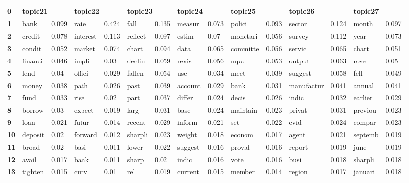 \begin{tabular}{|l|l|l||l|l||l|l||l|l||l|l||l|l||l|l||}
\toprule
\textbf{0} & \multicolumn{2}{l}{topic21} & \multicolumn{2}{l}{topic22} & \multicolumn{2}{l}{topic23} & \multicolumn{2}{l}{topic24} & \multicolumn{2}{l}{topic25} & \multicolumn{2}{l}{topic26} & \multicolumn{2}{l}{topic27} \\
\midrule
\textbf{1 } &  bank &  0.099 &  rate &  0.424 &  fall &  0.135 &  measur &  0.073 &  polici &  0.093 &  sector &  0.124 &  month &  0.097 \\
\textbf{2 } &  credit &  0.078 &  interest &  0.113 &  reflect &  0.097 &  estim &  0.07 &  monetari &  0.056 &  survey &  0.112 &  year &  0.073 \\
\textbf{3 } &  condit &  0.052 &  market &  0.074 &  chart &  0.094 &  data &  0.065 &  committe &  0.056 &  servic &  0.065 &  chart &  0.051 \\
\textbf{4 } &  financi &  0.046 &  impli &  0.03 &  declin &  0.059 &  revis &  0.056 &  mpc &  0.053 &  output &  0.063 &  rose &  0.05 \\
\textbf{5 } &  lend &  0.04 &  offici &  0.029 &  fallen &  0.054 &  use &  0.034 &  meet &  0.039 &  suggest &  0.058 &  fell &  0.049 \\
\textbf{6 } &  money &  0.038 &  path &  0.026 &  past &  0.039 &  account &  0.029 &  bank &  0.031 &  manufactur &  0.041 &  annual &  0.041 \\
\textbf{7 } &  fund &  0.033 &  rise &  0.02 &  part &  0.037 &  differ &  0.024 &  decis &  0.026 &  indic &  0.032 &  earlier &  0.029 \\
\textbf{8 } &  borrow &  0.03 &  expect &  0.019 &  larg &  0.031 &  base &  0.024 &  maintain &  0.023 &  privat &  0.031 &  previou &  0.023 \\
\textbf{9 } &  loan &  0.021 &  futur &  0.014 &  recent &  0.029 &  inform &  0.021 &  set &  0.022 &  evid &  0.024 &  compar &  0.023 \\
\textbf{10} &  deposit &  0.02 &  forward &  0.012 &  sharpli &  0.023 &  weight &  0.018 &  econom &  0.017 &  agent &  0.021 &  septemb &  0.019 \\
\textbf{11} &  broad &  0.02 &  basi &  0.011 &  lower &  0.022 &  suggest &  0.016 &  provid &  0.016 &  report &  0.019 &  june &  0.019 \\
\textbf{12} &  avail &  0.017 &  bank &  0.011 &  sharp &  0.02 &  indic &  0.016 &  vote &  0.016 &  busi &  0.018 &  sharpli &  0.018 \\
\textbf{13} &  tighten &  0.015 &  curv &  0.01 &  rel &  0.019 &  current &  0.015 &  member &  0.014 &  region &  0.017 &  januari &  0.018 \\

\end{tabular}

